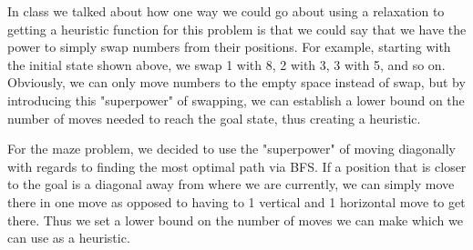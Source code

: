 \documentclass[11pt]{scrartcl} %
\begin{document}
 \vspace{2em}

In class we talked about how one way we could go about using a relaxation to getting a heuristic function for this problem is that we could say that we have the power to simply swap numbers from their positions. For example, starting with the initial state shown above, we swap 1 with 8, 2 with 3, 3 with 5, and so on. Obviously, we can only move numbers to the empty space instead of swap, but by introducing this "superpower" of swapping, we can establish a lower bound on the number of moves needed to reach the goal state, thus creating a heuristic.

\vspace{2em}
For the maze problem, we decided to use the "superpower" of moving diagonally with regards to finding the most optimal path via BFS. If a position that is closer to the goal is a diagonal away from where we are currently, we can simply move there in one move as opposed to having to 1 vertical and 1 horizontal move to get there. Thus we set a lower bound on the number of moves we can make which we can use as a heuristic.

\vspace{2em}
\end{document}

